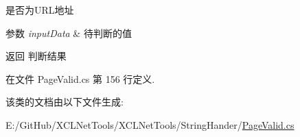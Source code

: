 是否为\+U\+R\+L地址 


\begin{DoxyParams}{参数}
{\em input\+Data} & 待判断的值\\
\hline
\end{DoxyParams}
\begin{DoxyReturn}{返回}
判断结果
\end{DoxyReturn}


在文件 Page\+Valid.\+cs 第 156 行定义.



该类的文档由以下文件生成\+:\begin{DoxyCompactItemize}
\item 
E\+:/\+Git\+Hub/\+X\+C\+L\+Net\+Tools/\+X\+C\+L\+Net\+Tools/\+String\+Hander/\hyperlink{_page_valid_8cs}{Page\+Valid.\+cs}\end{DoxyCompactItemize}
